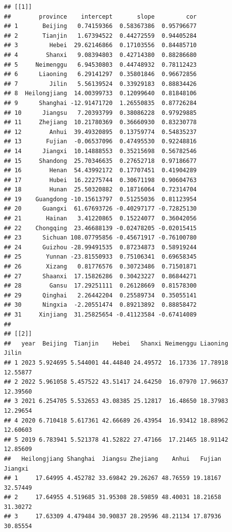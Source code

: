 \documentclass[]{article}
\begin{document}
\begin{verbatim}
## [[1]]
##        province    intercept       slope         cor
## 1       Beijing   0.74159366  0.58367386  0.95796677
## 2       Tianjin   1.67394522  0.44272559  0.94405284
## 3         Hebei  29.62146866  0.17103556  0.84485710
## 4        Shanxi   9.08394803  0.42714380  0.88286680
## 5     Neimenggu   6.94530803  0.44748932  0.78112423
## 6      Liaoning   6.29141297  0.35801846  0.96672856
## 7         Jilin   5.56139524  0.33929183  0.88834426
## 8  Heilongjiang  14.00399733  0.12099640  0.81848106
## 9      Shanghai -12.91471720  1.26550835  0.87726284
## 10      Jiangsu   7.20393799  0.38086228  0.97929885
## 11     Zhejiang  10.21780369  0.36660930  0.83230778
## 12        Anhui  39.49320895  0.13759774  0.54835237
## 13       Fujian  -0.06537096  0.47495530  0.92248816
## 14      Jiangxi  10.14888553  0.35215698  0.56782546
## 15     Shandong  25.70346635  0.27652718  0.97186677
## 16        Henan  54.43992172  0.17707451  0.41904289
## 17        Hubei  16.22275744  0.30671198  0.90604763
## 18        Hunan  25.50320882  0.18716064  0.72314704
## 19    Guangdong -10.15613797  0.51255036  0.81123954
## 20      Guangxi  61.67693726 -0.40297177 -0.72825130
## 21       Hainan   3.41220865  0.15224077  0.36042056
## 22    Chongqing  23.46688139 -0.02478205 -0.02015415
## 23      Sichuan 108.07795856 -0.45671917 -0.76100780
## 24      Guizhou -28.99491535  0.87234873  0.58919244
## 25       Yunnan -23.81550933  0.75106341  0.69658345
## 26       Xizang   0.81776576  0.30723486  0.71501871
## 27      Shaanxi  17.15826286  0.30423227  0.86844271
## 28        Gansu  17.29251111  0.26128669  0.81578300
## 29      Qinghai   2.26442204  0.25589734  0.35055141
## 30      Ningxia  -2.20551474  0.89213892  0.88858472
## 31     Xinjiang  31.25825654 -0.41123584 -0.67414089
## 
## [[2]]
##   year  Beijing  Tianjin    Hebei   Shanxi Neimenggu Liaoning    Jilin
## 1 2023 5.924695 5.544001 44.44840 24.49572  16.17336 17.78918 12.55877
## 2 2022 5.961058 5.457522 43.51417 24.64250  16.07970 17.96637 12.39560
## 3 2021 6.254705 5.532653 43.08385 25.12817  16.48650 18.37983 12.29654
## 4 2020 6.710418 5.617361 42.66689 26.43954  16.93412 18.88962 12.60603
## 5 2019 6.783941 5.521378 41.52822 27.47166  17.21465 18.91142 12.85609
##   Heilongjiang Shanghai  Jiangsu Zhejiang    Anhui   Fujian  Jiangxi
## 1     17.64995 4.452782 33.69842 29.26267 48.76559 19.18167 32.57449
## 2     17.64955 4.519685 31.95308 28.59859 48.40031 18.21658 31.30272
## 3     17.63309 4.479484 30.90837 28.29596 48.21134 17.87936 30.85554

\end{verbatim}
\end{document}
